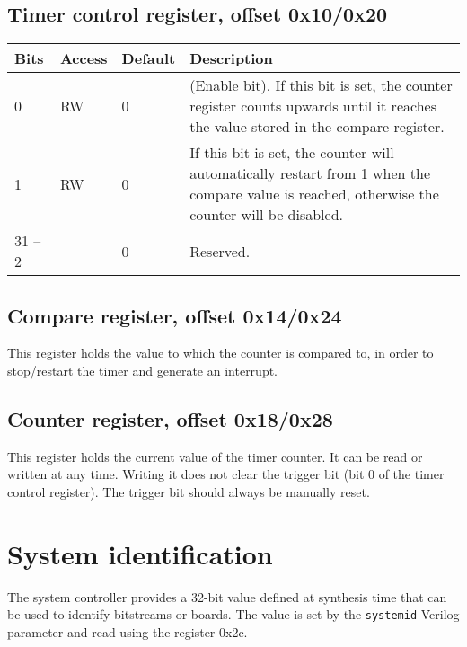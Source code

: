 \documentclass[a4paper,11pt]{article}
\begin{document}
\subsection{Timer control register, offset 0x10/0x20}
\begin{tabularx}{\textwidth}{|l|l|l|X|}
\hline
\bf Bits & \bf Access & \bf Default & \bf Description \\
\hline
0 & RW & 0 & (Enable bit). If this bit is set, the counter register counts upwards until it reaches the value stored in the compare register. \\
\hline
1 & RW & 0 & If this bit is set, the counter will automatically restart from 1 when the compare value is reached, otherwise the counter will be disabled. \\
\hline
31 -- 2 & --- & 0 & Reserved. \\
\hline
\end{tabularx}

\subsection{Compare register, offset 0x14/0x24}
This register holds the value to which the counter is compared to, in order to stop/restart the timer and generate an interrupt.

\subsection{Counter register, offset 0x18/0x28}
This register holds the current value of the timer counter. It can be read or written at any time.
Writing it does not clear the trigger bit (bit 0 of the timer control register). The trigger bit should always be manually reset.

\section{System identification}
The system controller provides a 32-bit value defined at synthesis time that can be used to identify bitstreams or boards. The value is set by the \verb!systemid! Verilog parameter and read using the register 0x2c.
\end{document}
